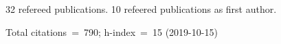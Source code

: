 32 refereed publications. 10 refeered publications as first author.

Total citations~=~790; h-index~=~15 (2019-10-15)